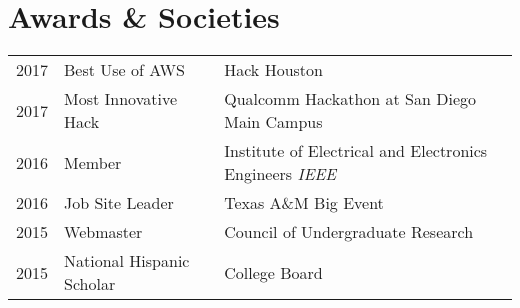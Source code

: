 \documentclass[letterpaper]{deedy-resume} %
\begin{document}
\begin{minipage}[t]{0.66\textwidth}

%
%
%
%




\section{Awards \& Societies} 

\begin{tabular}{rll}
2017	 & Best Use of AWS & Hack Houston \\
2017	 & Most Innovative Hack & Qualcomm Hackathon at San Diego Main Campus \\
2016	 & Member & Institute of Electrical and Electronics Engineers \textit{IEEE}\\
2016     & Job Site Leader & Texas A\&M Big Event\\
2015	 & Webmaster & Council of Undergraduate Research \\
2015	 & National Hispanic Scholar & College Board \\
\end{tabular}


\end{minipage}
\end{document}
